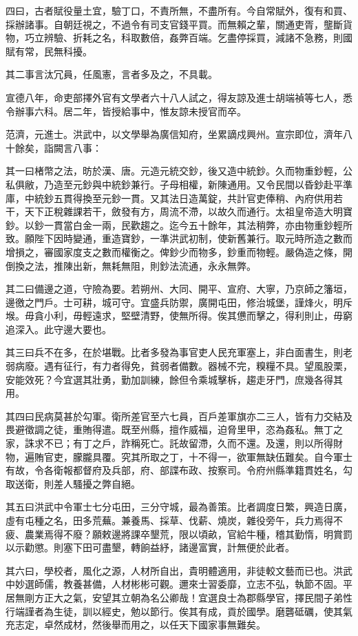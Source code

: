 \begin{pinyinscope}
四曰，古者賦役量土宜，驗丁口，不責所無，不盡所有。今自常賦外，復有和買、採辦諸事。自朝廷視之，不過令有司支官錢平買。而無賴之輩，關通吏胥，壟斷貨物，巧立辨驗、折耗之名，科取數倍，姦弊百端。乞盡停採買，減諸不急務，則國賦有常，民無科擾。

其二事言汰冗員，任風憲，言者多及之，不具載。

宣德八年，命吏部擇外官有文學者六十八人試之，得友諒及進士胡端禎等七人，悉令辦事六科。居二年，皆授給事中，惟友諒未授官而卒。

范濟，元進士。洪武中，以文學舉為廣信知府，坐累謫戍興州。宣宗即位，濟年八十餘矣，詣闕言八事：

其一曰楮幣之法，昉於漢、唐。元造元統交鈔，後又造中統鈔。久而物重鈔輕，公私俱敝，乃造至元鈔與中統鈔兼行。子母相權，新陳通用。又令民間以昏鈔赴平準庫，中統鈔五貫得換至元鈔一貫。又其法日造萬錠，共計官吏俸稍、內府供用若干，天下正稅雜課若干，斂發有方，周流不滯，以故久而通行。太祖皇帝造大明寶鈔。以鈔一貫當白金一兩，民歡趨之。迄今五十餘年，其法稍弊，亦由物重鈔輕所致。願陛下因時變通，重造寶鈔，一準洪武初制，使新舊兼行。取元時所造之數而增損之，審國家度支之數而權衡之。俾鈔少而物多，鈔重而物輕。嚴偽造之條，開倒換之法，推陳出新，無耗無阻，則鈔法流通，永永無弊。

其二曰備邊之道，守險為要。若朔州、大同、開平、宣府、大寧，乃京師之籓垣，邊徼之門戶。士可耕，城可守。宜盛兵防禦，廣開屯田，修治城堡，謹烽火，明斥堠。毋貪小利，毋輕遠求，堅壁清野，使無所得。俟其憊而擊之，得利則止，毋窮追深入。此守邊大要也。

其三曰兵不在多，在於堪戰。比者多發為事官吏人民充軍塞上，非白面書生，則老弱病廢。遇有征行，有力者得免，貧弱者備數。器械不完，糗糧不具。望風股栗，安能效死？今宜選其壯勇，勤加訓練，餘但令乘城擊柝，趨走牙門，庶幾各得其用。

其四曰民病莫甚於勾軍。衛所差官至六七員，百戶差軍旗亦二三人，皆有力交結及畏避徵調之徒，重賄得遣。既至州縣，擅作威福，迫脅里甲，恣為姦私。無丁之家，誅求不已；有丁之戶，詐稱死亡。託故留滯，久而不還。及還，則以所得財物，遍賄官吏，朦朧具覆。究其所取之丁，十不得一，欲軍無缺伍難矣。自今軍士有故，令各衛報都督府及兵部，府、部諜布政、按察司。令府州縣準籍貫姓名，勾取送衛，則差人騷擾之弊自絕。

其五曰洪武中令軍士七分屯田，三分守城，最為善策。比者調度日繁，興造日廣，虛有屯種之名，田多荒蕪。兼養馬、採草、伐薪、燒炭，雜役旁午，兵力焉得不疲、農業焉得不廢？願敕邊將課卒墾荒，限以頃畝，官給牛種，稽其勤惰，明賞罰以示勸懲。則塞下田可盡墾，轉餉益紓，諸邊富實，計無便於此者。

其六曰，學校者，風化之源，人材所自出，貴明體適用，非徒較文藝而已也。洪武中妙選師儒，教養甚備，人材彬彬可觀。邇來士習委靡，立志不弘，執節不固。平居無剛方正大之氣，安望其立朝為名公卿哉！宜選良士為郡縣學官，擇民間子弟性行端謹者為生徒，訓以經史，勉以節行。俟其有成，貢於國學。磨礱砥礪，使其氣充志定，卓然成材，然後舉而用之，以任天下國家事無難矣。


\end{pinyinscope}
